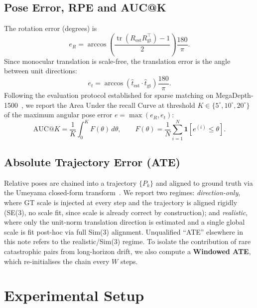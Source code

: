 \documentclass[11pt,a4paper]{article}
\begin{document}
\subsection{Pose Error, RPE and AUC@K}
The rotation error (degrees) is
\begin{equation}
  e_R = \arccos\!\left(\frac{\operatorname{tr}(R_{\mathrm{est}}
        R_{\mathrm{gt}}^{\top}) - 1}{2}\right)\frac{180}{\pi}.
\end{equation}
Since monocular translation is scale-free, the translation error is the
angle between unit directions:
\begin{equation}
  e_t = \arccos(\hat{t}_{\mathrm{est}} \cdot \hat{t}_{\mathrm{gt}})
        \frac{180}{\pi}.
\end{equation}
Following the evaluation protocol established for sparse matching on
MegaDepth-1500~\cite{lightglue,wang2026}, we report the Area Under the
recall Curve at threshold $K \in \{5^\circ, 10^\circ, 20^\circ\}$ of
the maximum angular pose error $e = \max(e_R, e_t)$:
\begin{equation}
  \mathrm{AUC@}K = \frac{1}{K}\int_0^K F(\theta)\,d\theta,
  \qquad
  F(\theta) = \frac{1}{N}\sum_{i=1}^{N}
              \mathbf{1}[e^{(i)} \le \theta].
\end{equation}

\subsection{Absolute Trajectory Error (ATE)}
Relative poses are chained into a trajectory $\{P_k\}$ and aligned to
ground truth via the Umeyama closed-form transform~\cite{umeyama}.  We
report two regimes: \emph{direction-only}, where GT scale is injected
at every step and the trajectory is aligned rigidly (SE(3), no scale
fit, since scale is already correct by construction); and
\emph{realistic}, where only the unit-norm translation direction is
estimated and a single global scale is fit post-hoc via full Sim(3)
alignment. Unqualified ``ATE'' elsewhere in this note refers to the
realistic/Sim(3) regime. To isolate the contribution of rare
catastrophic pairs from long-horizon drift, we also compute a
\textbf{Windowed ATE}, which re-initialises the chain every $W$ steps.

\section{Experimental Setup}
\end{document}
